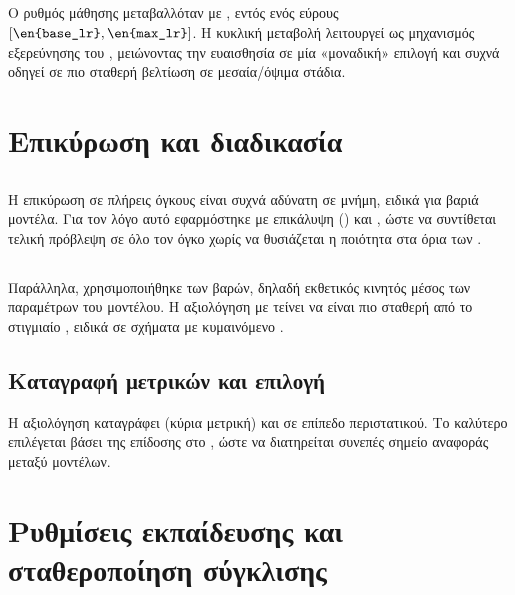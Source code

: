\subsection{}
Ο ρυθμός μάθησης μεταβαλλόταν με 
\cite{smith2017cyclical}, εντός ενός εύρους $[\texttt{\en{base\_lr}}, \texttt{\en{max\_lr}}]$.
Η κυκλική μεταβολή λειτουργεί ως μηχανισμός εξερεύνησης του , μειώνοντας την ευαισθησία σε μία «μοναδική» επιλογή 
και συχνά οδηγεί σε πιο σταθερή βελτίωση σε μεσαία/όψιμα στάδια.

\section{Επικύρωση και διαδικασία }
\label{sec:proto_validation}

\subsection{}
Η επικύρωση σε πλήρεις  όγκους είναι συχνά αδύνατη σε μνήμη, ειδικά για
βαριά μοντέλα. Για τον λόγο αυτό εφαρμόστηκε 
με επικάλυψη () και , ώστε να συντίθεται
τελική πρόβλεψη σε όλο τον όγκο χωρίς να θυσιάζεται η ποιότητα στα όρια των
.

\subsection{}
Παράλληλα, χρησιμοποιήθηκε  των βαρών, δηλαδή εκθετικός κινητός μέσος
των παραμέτρων του μοντέλου. Η αξιολόγηση με  τείνει να είναι πιο
σταθερή από το στιγμιαίο , ειδικά σε σχήματα με κυμαινόμενο
.

\subsection{Καταγραφή μετρικών και επιλογή }
Η αξιολόγηση καταγράφει  (κύρια μετρική) και  σε επίπεδο
 περιστατικού. Το καλύτερο  επιλέγεται βάσει της επίδοσης
στο , ώστε να διατηρείται συνεπές σημείο αναφοράς μεταξύ
μοντέλων.

\section{Ρυθμίσεις εκπαίδευσης και σταθεροποίηση σύγκλισης}
\label{sec:proto_training_details}

